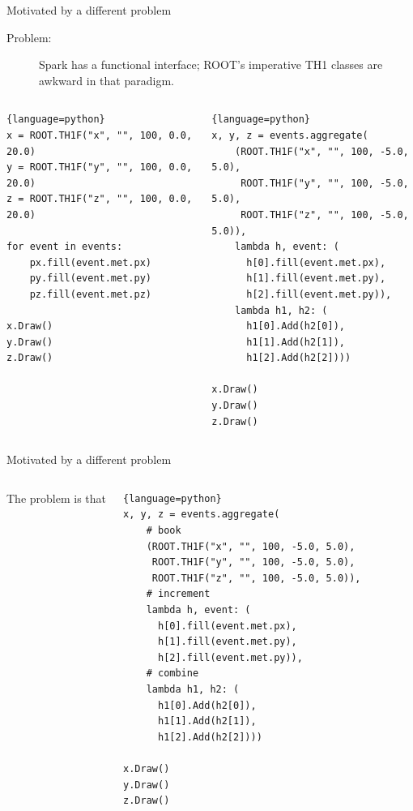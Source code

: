 \documentclass{beamer}
\begin{document}
\begin{frame}[fragile]{Motivated by a different problem}
\begin{description}
\item[Problem:] Spark has a functional interface; ROOT's imperative TH1 classes are awkward in that paradigm.
\end{description}

\begin{columns}
\begin{lstlisting}{language=python}
x = ROOT.TH1F("x", "", 100, 0.0, 20.0)
y = ROOT.TH1F("y", "", 100, 0.0, 20.0)
z = ROOT.TH1F("z", "", 100, 0.0, 20.0)

for event in events:
    px.fill(event.met.px)
    py.fill(event.met.py)
    pz.fill(event.met.pz)

x.Draw()
y.Draw()
z.Draw()
\end{lstlisting}

\begin{lstlisting}{language=python}
x, y, z = events.aggregate(
    (ROOT.TH1F("x", "", 100, -5.0, 5.0),
     ROOT.TH1F("y", "", 100, -5.0, 5.0),
     ROOT.TH1F("z", "", 100, -5.0, 5.0)),
    lambda h, event: (
      h[0].fill(event.met.px),
      h[1].fill(event.met.py),
      h[2].fill(event.met.py)),
    lambda h1, h2: (
      h1[0].Add(h2[0]),
      h1[1].Add(h2[1]),
      h1[2].Add(h2[2])))

x.Draw()
y.Draw()
z.Draw()
\end{lstlisting}
\end{columns}
\end{frame}

\begin{frame}[fragile]{Motivated by a different problem}
\begin{columns}
The problem is that 


\begin{lstlisting}{language=python}
x, y, z = events.aggregate(
    # book
    (ROOT.TH1F("x", "", 100, -5.0, 5.0),
     ROOT.TH1F("y", "", 100, -5.0, 5.0),
     ROOT.TH1F("z", "", 100, -5.0, 5.0)),
    # increment
    lambda h, event: (
      h[0].fill(event.met.px),
      h[1].fill(event.met.py),
      h[2].fill(event.met.py)),
    # combine
    lambda h1, h2: (
      h1[0].Add(h2[0]),
      h1[1].Add(h2[1]),
      h1[2].Add(h2[2])))

x.Draw()
y.Draw()
z.Draw()
\end{lstlisting}
\end{columns}
\end{frame}
\end{document}
